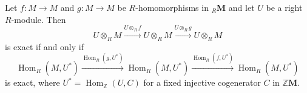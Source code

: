Let $f: M \to M$ and $g: M \to M$ be $R$-homomorphisms in ${}_R\mathbf{M}$ and let $U$ be a right $R$-module. Then
$$U \otimes_R M \xrightarrow{U \otimes_R f} U \otimes_R M \xrightarrow{U \otimes_R g} U \otimes_R M$$
is exact if and only if
$$\operatorname{Hom}_R(M, U^*) \xrightarrow{\operatorname{Hom}_R(g, U^*)} \operatorname{Hom}_R(M, U^*) \xrightarrow{\operatorname{Hom}_R(f, U^*)} \operatorname{Hom}_R(M, U^*)$$
is exact, where $U^* = \operatorname{Hom}_{\mathbb{Z}}(U, C)$ for a fixed injective cogenerator $C$ in $\mathbb{Z}\mathbf{M}$.

